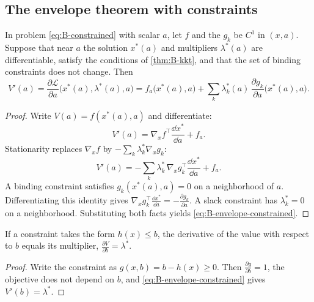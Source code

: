 \subsection{The envelope theorem with constraints}\label{sec:B-envelope-constrained}

\begin{theorem}\label{thm:B-envelope-constrained}
In problem \eqref{eq:B-constrained} with scalar $a$, let $f$ and the $g_k$ be $C^1$ in $(x, a)$. Suppose that near $a$
the solution $x^*(a)$ and multipliers $\lambda^*(a)$ are differentiable, satisfy the conditions of \cref{thm:B-kkt}, and
that the set of binding constraints does not change. Then
\begin{equation}\label{eq:B-envelope-constrained}
V'(a) = \frac{\partial \mathcal{L}}{\partial a}\big(x^*(a), \lambda^*(a), a\big)
= f_a\big(x^*(a), a\big) + \sum_{k}\lambda_k^*(a)\,\frac{\partial g_k}{\partial a}\big(x^*(a), a\big) .
\end{equation}
\end{theorem}

\begin{proof}
Write $V(a) = f(x^*(a), a)$ and differentiate:
\begin{equation*}
V'(a) = \nabla_x f^\top\frac{\dd x^*}{\dd a} + f_a .
\end{equation*}
Stationarity replaces $\nabla_x f$ by $-\sum_k\lambda_k^*\nabla_x g_k$:
\begin{equation*}
V'(a) = -\sum_k\lambda_k^*\,\nabla_x g_k^\top\frac{\dd x^*}{\dd a} + f_a .
\end{equation*}
A binding constraint satisfies $g_k(x^*(a), a) = 0$ on a neighborhood of $a$. Differentiating this identity gives
$\nabla_x g_k^\top\frac{\dd x^*}{\dd a} = -\frac{\partial g_k}{\partial a}$. A slack constraint has $\lambda_k^* = 0$ on a
neighborhood. Substituting both facts yields \eqref{eq:B-envelope-constrained}.
\end{proof}

\begin{corollary}\label{cor:B-shadow}
If a constraint takes the form $h(x) \leq b$, the derivative of the value with respect to $b$ equals its multiplier,
$\frac{\partial V}{\partial b} = \lambda^*$.
\end{corollary}

\begin{proof}
Write the constraint as $g(x, b) = b - h(x) \geq 0$. Then $\frac{\partial g}{\partial b} = 1$, the objective does not depend
on $b$, and \eqref{eq:B-envelope-constrained} gives $V'(b) = \lambda^*$.
\end{proof}

